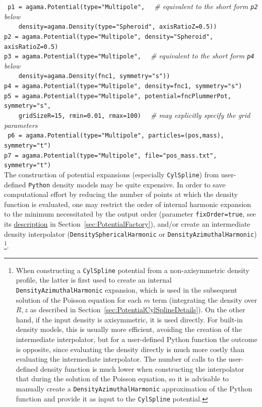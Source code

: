 \documentclass[12pt]{article}
\newcommand{\Python}{\texttt{Python}\xspace}
\newcommand{\ppp}[1]{\textcolor{darkolive} {\texttt{#1}}}
\begin{document}
\texttt{%
p1 = agama.Potential(type="Multipole",} \textit{\color{Sepia} \ \ \# equivalent to the short form \texttt{p2} below}\\
\texttt{\mbox{}~~~~density=agama.Density(type="Spheroid", axisRatioZ=0.5))\\
p2 = agama.Potential(type="Multipole", density="Spheroid", axisRatioZ=0.5)\\
p3 = agama.Potential(type="Multipole",} \textit{\color{Sepia} \ \ \# equivalent to the short form \texttt{p4} below}\\
\texttt{\mbox{}~~~~density=agama.Density(fnc1, symmetry="s"))\\
p4 = agama.Potential(type="Multipole", density=fnc1, symmetry="s")\\
p5 = agama.Potential(type="Multipole", potential=fncPlummerPot, symmetry="s", \\
\mbox{}~~~~gridSizeR=15, rmin=0.01, rmax=100)} \textit{\color{Sepia} \ \ \# may explicitly specify the grid parameters}\\
\texttt{%
p6 = agama.Potential(type="Multipole", particles=(pos,mass), symmetry="t")\\
p7 = agama.Potential(type="Multipole", file="pos_mass.txt", symmetry="t")}\\[2mm]
The construction of potential expansions (especially \ppp{CylSpline}) from user-defined \Python density models may be quite expensive. In order to save computational effort by reducing the number of points at which the density function is evaluated, one may restrict the order of internal harmonic expansion to the minimum necessitated by the output order (parameter \ppp{fixOrder=true}, see its \hyperref[sec:PotentialExpansionParams]{description} in Section~\ref{sec:PotentialFactory}), and/or create an intermediate density interpolator (\ppp{DensitySphericalHarmonic} or \ppp{DensityAzimuthalHarmonic})%
\footnote{When constructing a \ppp{CylSpline} potential from a non-axisymmetric density profile, the latter is first used to create an internal \ppp{DensityAzimuthalHarmonic} expansion, which is used in the subsequent solution of the Poisson equation for each $m$ term (integrating the density over $R,z$ as described in Section~\ref{sec:PotentialCylSplineDetails}). On the other hand, if the input density is axisymmetric, it is used directly. For built-in density models, this is usually more efficient, avoiding the creation of the intermediate interpolator, but for a user-defined Python function the outcome is opposite, since evaluating the density directly is much more costly than evaluating the intermediate interpolator. The number of calls to the user-defined density function is much lower when constructing the interpolator that during the solution of the Poisson equation, so it is advisable to manually create a \ppp{DensityAzimuthalHarmonic} approximation of the Python function and provide it as input to the \ppp{CylSpline} potential.}.
\end{document}
